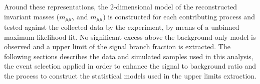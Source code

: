 Around these representations, the 2-dimensional model of the reconstructed invariant masses ($m_{\mu\mu\gamma}$ and $m_{\mu\mu}$) is constructed for each contributing process and tested against the collected data by the experiment, by means of a unbinned maximum likelihood fit. No significant excess above the background-only model is observed and a upper limit of the signal branch fraction is extracted. The following sections describes the data and simulated samples used in this analysis, the event selection applied in order to enhance the signal to background ratio and the process to construct the statistical models used in the upper limits extraction.
